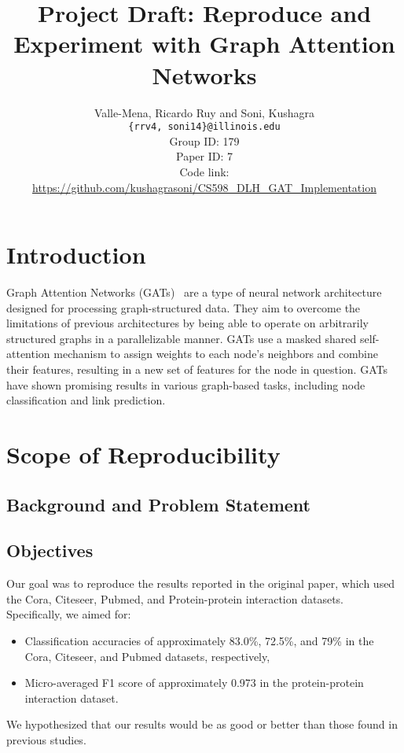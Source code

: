 \documentclass{article}
\title{Project Draft: Reproduce and Experiment with Graph Attention Networks}
\author
{Valle-Mena, Ricardo Ruy and Soni, Kushagra \\
    \texttt{\{rrv4, soni14\}@illinois.edu}
    \\[2em]
    Group ID: 179\\
    Paper ID: 7\\
    Code link: \url{https://github.com/kushagrasoni/CS598_DLH_GAT_Implementation}
    \\[2em]
}
\begin{document}
    \maketitle

    \section{Introduction}\label{sec:introduction}

    Graph Attention Networks (GATs)~\cite{velickovic2018graph} are a type of neural network architecture designed for
    processing graph-structured data.
    They aim to overcome the limitations of previous architectures by being able to operate on arbitrarily structured graphs in a parallelizable manner.
    GATs use a masked shared self-attention mechanism to assign weights to each node's neighbors and combine their features, resulting in a new set of features for the node in question.
    GATs have shown promising results in various graph-based tasks, including node classification and link prediction.

    \section{Scope of Reproducibility}\label{sec:scope-of-reproducibility}

    \subsection{Background and Problem Statement}\label{sec:background-and-problem-statement}
    

    \subsection{Objectives}\label{sec:objectives}
    Our goal was to reproduce the results reported in the original paper, which used the Cora, Citeseer, Pubmed, and Protein-protein interaction datasets. Specifically, we aimed for:
    \begin{itemize}
        \item Classification accuracies of approximately 83.0\%, 72.5\%, and 79\% in the Cora, Citeseer, and Pubmed
        datasets, respectively,
        \item Micro-averaged F1 score of approximately 0.973 in the protein-protein interaction dataset.
    \end{itemize}
    We hypothesized that our results would be as good or better than those found in previous studies.
\end{document}
